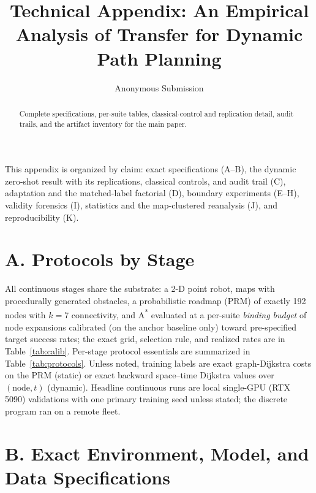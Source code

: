 \documentclass[letterpaper]{article} %
\title{Technical Appendix: An Empirical Analysis of Transfer for Dynamic Path Planning}
\author{Anonymous Submission}
\begin{document}
\maketitle

\begin{abstract}
Complete specifications, per-suite tables, classical-control and replication detail, audit trails, and the artifact inventory for the main paper.
\end{abstract}

This appendix is organized by claim: exact specifications (A--B), the dynamic zero-shot result with its replications, classical controls, and audit trail (C), adaptation and the matched-label factorial (D), boundary experiments (E--H), validity forensics (I), statistics and the map-clustered reanalysis (J), and reproducibility (K).

\section{A. Protocols by Stage}

All continuous stages share the substrate: a 2-D point robot, maps with procedurally generated obstacles, a probabilistic roadmap (PRM) of exactly 192 nodes with $k{=}7$ connectivity, and A\textsuperscript{*} evaluated at a per-suite \emph{binding budget} of node expansions calibrated (on the anchor baseline only) toward pre-specified target success rates; the exact grid, selection rule, and realized rates are in Table~\ref{tab:calib}. Per-stage protocol essentials are summarized in Table~\ref{tab:protocols}. Unless noted, training labels are exact graph-Dijkstra costs on the PRM (static) or exact backward space--time Dijkstra values over $(\text{node},t)$ (dynamic). Headline continuous runs are local single-GPU (RTX 5090) validations with one primary training seed unless stated; the discrete program ran on a remote fleet.

\section{B. Exact Environment, Model, and Data Specifications}
\end{document}
